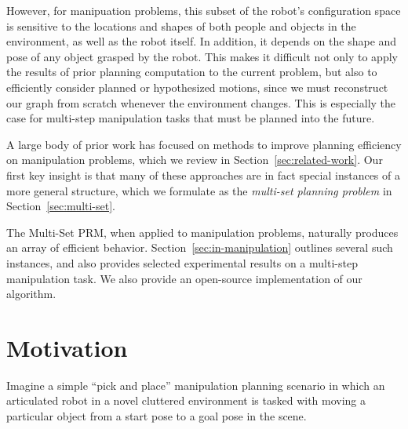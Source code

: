 \documentclass{report}
\begin{document}
However,
for manipuation problems,
this subset of the robot's configuration space
is sensitive to the locations and shapes of
both people and objects in the environment,
as well as the robot itself.
In addition, it depends on the shape and pose of any object
grasped by the robot.
This makes it difficult not only to apply the results of prior
planning computation to the current problem,
but also to efficiently consider planned or hypothesized motions,
since we must reconstruct our graph from scratch whenever
the environment changes.
This is especially the case for
multi-step manipulation tasks that must be planned into the future.

A large body of prior work has focused on methods to
improve planning efficiency on manipulation problems,
which we review in Section~\ref{sec:related-work}.
Our first key insight is that many of these approaches are
in fact special instances of a more general structure,
which we formulate as the \emph{multi-set planning problem}
in Section~\ref{sec:multi-set}.

The Multi-Set PRM,
when applied to manipulation problems,
naturally produces an array of efficient behavior.
Section~\ref{sec:in-manipulation} outlines several such instances,
and also provides selected experimental results
on a multi-step manipulation task.
We also provide an open-source implementation of our algorithm.

\section{Motivation}

Imagine a simple ``pick and place'' manipulation planning scenario
in which an articulated robot in a novel cluttered environment
is tasked with moving a particular object from a start pose to a goal
pose in the scene.
\end{document}
